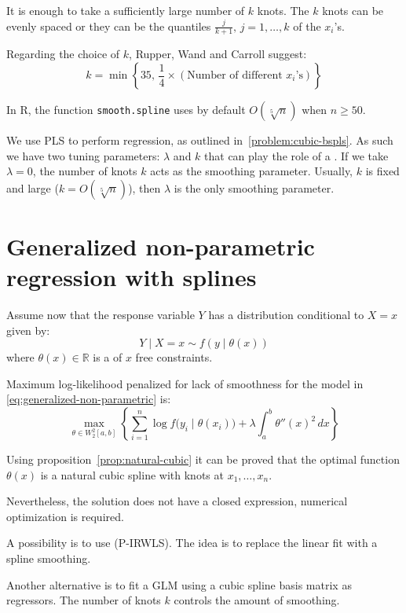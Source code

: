 It is enough to take a sufficiently large number of $k$ knots. The
$k$ knots can be evenly spaced or they can be the quantiles
$\frac{j}{k+1},\,j=1,\ldots,k$ of the $x_i$'s.

Regarding the choice of $k$, Rupper, Wand and Carroll suggest:
\begin{equation*}
    k = \min \left\{
        35,\, \frac{1}{4} \times \left( \text{Number of different $x_i$'s} \right)
    \right\}
\end{equation*}

In R, the function \texttt{smooth.spline} uses by default $O\left(\sqrt[5]n\right)$ when
$n \geq 50$.

We use PLS to perform regression, as outlined in~\ref{problem:cubic-bspls}. As such we
have two tuning parameters: $\lambda$ and $k$ that can play the role
of a . If we take $\lambda=0$, the number
of knots $k$ acts as the smoothing parameter. Usually, $k$ is
fixed and large ($k = O(\sqrt[5]n)$), then $\lambda$ is the
only smoothing parameter.

\pagebreak \null {}%
\section{Generalized non-parametric regression with splines}%

Assume now that the response variable $Y$ has a distribution conditional
to $X = x$ given by:
\begin{equation}\label{eq:generalized-non-parametric}
    Y \mid X=x \sim f(y \mid \theta(x))
\end{equation}
where $\theta(x) \in \mathds{R}$ is a  of
$x$ free constraints.

\begin{problem}{Maximum log-likelihood penalized for lack of smoothness}{}
    for the model in \cref{eq:generalized-non-parametric} is:
    \begin{equation*}
        \max_{\theta \in W_2^2[a,b]} \left \{
            \sum_{i=1}^n \log f\bigl(y_i \mid \theta(x_i)\bigr)
            + \lambda \int_a^b \theta''(x)^2\,dx
            \right \}
    \end{equation*}
\end{problem}

Using proposition~\ref{prop:natural-cubic} it can be proved that the optimal
function $\theta(x)$ is a natural cubic spline with knots at $x_1,\ldots,x_n$.

\begin{note}
Nevertheless, the solution does not have a closed expression, numerical
optimization is required.
\end{note}

A possibility is to use 
(P-IRWLS). The idea is to replace the linear fit
with a spline smoothing.

Another alternative is to fit a GLM using a cubic spline basis matrix as
regressors. The number of knots $k$ controls the amount of smoothing.

